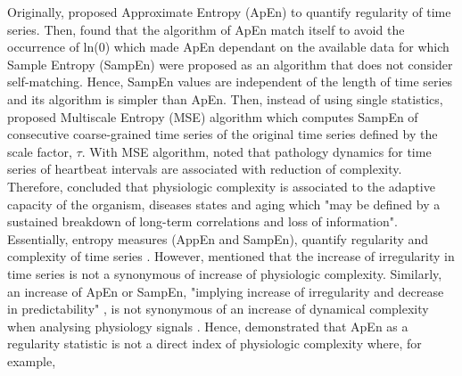 Originally, \cite{pincus1991, pincus1995} proposed Approximate Entropy (ApEn) 
to quantify regularity of time series.
Then, \cite{richman2000} found that the algorithm of ApEn match itself 
to avoid the occurrence of ln(0) which made ApEn dependant on the available 
data for which Sample Entropy (SampEn) were proposed as an algorithm that 
does not consider self-matching. 
Hence, SampEn values are independent of the length of time series and its 
algorithm is simpler than ApEn.
Then, instead of using single statistics, \cite{costa2002} proposed 
Multiscale Entropy (MSE) algorithm which computes SampEn of consecutive 
coarse-grained time series of the original time series defined by the 
scale factor, $\tau$.
With MSE algorithm, \citep{costa2002} noted that 
pathology dynamics for time series of heartbeat intervals 
are associated with reduction of complexity.
Therefore, \citealt[p. 3]{costa2002} concluded that physiologic complexity 
is associated to the adaptive capacity of the organism,  
diseases states and aging which "may be defined by a sustained 
 breakdown of long-term correlations and loss of information".
Essentially, entropy measures (AppEn and SampEn), 
quantify regularity and complexity of time series \citep{preatoni2013}.
However, \cite{goldberger1996} mentioned that the increase of irregularity 
in time series is not a synonymous of increase of physiologic complexity.
Similarly, an increase of ApEn or SampEn, "implying increase of irregularity 
and decrease in predictability" \cite[p. 25]{goldberger2002b}, is not 
synonymous of an increase of dynamical complexity when analysing physiology 
signals \citep{costa2002}.
Hence, \cite{goldberger2002b} demonstrated that ApEn as a regularity 
statistic is not a direct index of physiologic complexity where, for example, 
